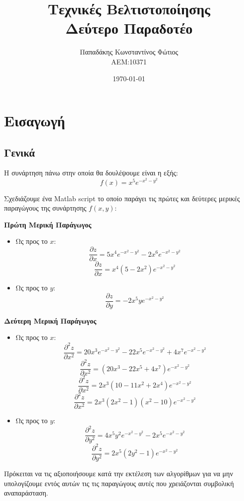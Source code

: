 \documentclass{report}
\begin{document}

\title{\Huge \bfseries Τεχνικές Βελτιστοποίησης \\ Δεύτερο Παραδοτέο} %
\author{Παπαδάκης Κωνσταντίνος Φώτιος\vspace{0.5cm} \\  ΑΕΜ:10371} %
\date{\today}
\maketitle

\tableofcontents

\chapter{Εισαγωγή}
\section{Γενικά}
Η συνάρτηση πάνω στην οποία θα δουλέψουμε είναι η εξής:
$$f(x) = x^5 e^{-x^2-y^2}$$

Σχεδιάζουμε ένα Matlab script
το οποίο παράγει τις πρώτες και δεύτερες μερικές παραγώγους της 
συνάρτησης $f(x,y)$:

\textbf{Πρώτη Μερική Παράγωγος}
\begin{itemize}
    \item Ως προς το $x$:
    $$\frac{\partial{z}}{\partial{x}} = 5x^4e^{-x^2-y^2} - 2x^6e^{-x^2-y^2}$$
    $$\frac{\partial{z}}{\partial{x}} = x^4(5-2x^2)e^{-x^2-y^2}$$
    \item Ως προς το $y$:
    $$\frac{\partial{z}}{\partial{y}} = -2x^{5}ye^{-x^2-y^2}$$
\end{itemize}

\textbf{Δεύτερη Μερική Παράγωγος}
\begin{itemize}
    \item Ως προς το $x$:
    $$\frac{\partial^2{z}}{\partial{x^2}} = 20x^{3}e^{-x^2-y^2}-22x^{5}e^{-x^2-y^2}+4x^{7}e^{-x^2-y^2}$$
    $$\frac{\partial^2{z}}{\partial{x^2}} = (20x^3 -22x^5 +4x^7)e^{-x^2-y^2}$$
    $$\frac{\partial^2{z}}{\partial{x^2}} = 2x^3(10-11x^2+2x^4)e^{-x^2-y^2}$$
    $$\frac{\partial^2{z}}{\partial{x^2}} = 2x^3(2x^2-1)(x^2-10)e^{-x^2-y^2}$$
    \item Ως προς το $y$:
    $$\frac{\partial^2{z}}{\partial{y^2}} = 4x^{5}y^{2}e^{-x^2-y^2} - 2x^{5}e^{-x^2-y^2}$$
    $$\frac{\partial^2{z}}{\partial{y^2}} = 2x^{5}(2y^2-1)e^{-x^2-y^2}$$
\end{itemize}
Πρόκειται να τις αξιοποιήσουμε κατά την εκτέλεση των αλγορίθμων για να μην υπολογίζουμε 
εντός αυτών τις τις παραγώγους αυτές που χρειάζονται συμβολική αναπαράσταση.
\end{document}
